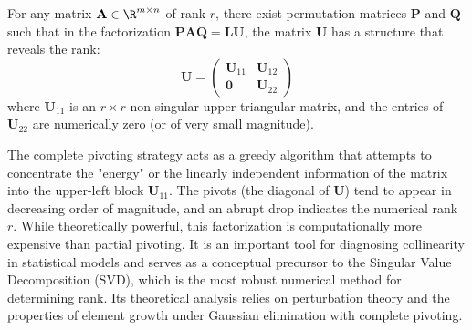 \begin{theorem}
For any matrix $\mathbf{A} \in \R^{m \times n}$ of rank $r$, there exist permutation matrices $\mathbf{P}$ and $\mathbf{Q}$ such that in the factorization $\mathbf{P}\mathbf{A}\mathbf{Q} = \mathbf{L}\mathbf{U}$, the matrix $\mathbf{U}$ has a structure that reveals the rank:
\[ \mathbf{U} = \begin{pmatrix} \mathbf{U}_{11} & \mathbf{U}_{12} \\ \mathbf{0} & \mathbf{U}_{22} \end{pmatrix} \]
where $\mathbf{U}_{11}$ is an $r \times r$ non-singular upper-triangular matrix, and the entries of $\mathbf{U}_{22}$ are numerically zero (or of very small magnitude).
\end{theorem}

\begin{remark}
The complete pivoting strategy acts as a greedy algorithm that attempts to concentrate the "energy" or the linearly independent information of the matrix into the upper-left block $\mathbf{U}_{11}$. The pivots (the diagonal of $\mathbf{U}$) tend to appear in decreasing order of magnitude, and an abrupt drop indicates the numerical rank $r$. While theoretically powerful, this factorization is computationally more expensive than partial pivoting. It is an important tool for diagnosing collinearity in statistical models and serves as a conceptual precursor to the Singular Value Decomposition (SVD), which is the most robust numerical method for determining rank. Its theoretical analysis relies on perturbation theory and the properties of element growth under Gaussian elimination with complete pivoting.
\end{remark}